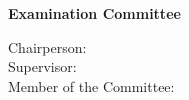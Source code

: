 \begin{titlepage}
\begin{center}
{\Large \textbf{Examination Committee}}\\[0.75cm]

\begin{minipage}[t]{.4\textwidth}
  \begin{flushright}
    {\large Chairperson:\:}\\
    {\large Supervisor:\:}\\
    {\large Member of the Committee:\:}
  \end{flushright}
\end{minipage}%
\begin{minipage}[t]{.6\textwidth}
  \begin{flushleft}
    {\large \Chairperson}\\
    {\large \Advisor}\\
    {\large \CommitteeMembers}
  \end{flushleft}
\end{minipage}\\[3.5cm]

{\Large \textbf{\Month\:\Year}}\\
\end{center}
\end{titlepage}
